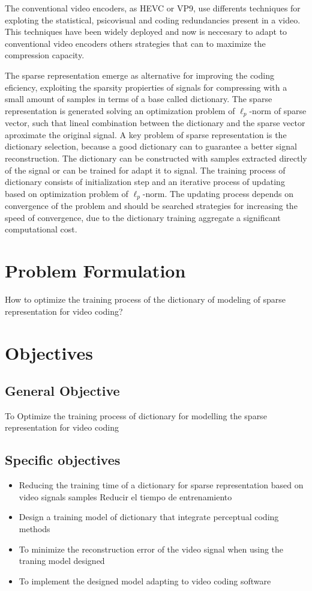The conventional video encoders, as HEVC or VP9, use differents techniques for
exploting the statistical, psicovisual and coding redundancies present in a
video. This techniques have been widely deployed and now is neccesary to adapt
to conventional video encoders others strategies that can to maximize the
compression capacity. 

The sparse representation emerge as alternative for improving the coding
eficiency, exploiting the sparsity propierties of signals for compressing with a
small amount of samples in terms of a base called dictionary. The sparse
representation is generated solving an optimization problem of $\ell_p$-norm of
sparse vector, such that lineal combination between the dictionary and the
sparse vector aproximate the original signal. A key problem of sparse
representation is the dictionary selection, because a good dictionary can to
guarantee a better signal reconstruction. The dictionary can be constructed with
samples extracted directly of the signal or can be trained for adapt it to
signal. The training process of dictionary consists of initialization step and
an iterative process of updating based on optimization problem of $\ell_p$-norm.
The updating process depends on convergence of the problem and should be
searched strategies for increasing the speed of convergence, due to the
dictionary training aggregate a significant computational cost.



\section{Problem Formulation}
How to optimize the training process of the dictionary of modeling of sparse
representation for video coding?

\section{Objectives}
\subsection{General Objective}
To Optimize the training process of dictionary for modelling the sparse
representation for video coding

\subsection{Specific objectives}
\begin{itemize}
\item Reducing the training time of a dictionary for sparse
representation based on video signals samples Reducir el tiempo de entrenamiento
\item Design a training model of dictionary that integrate perceptual coding
methods
\item To minimize the reconstruction error of the video signal when
using the traning model designed
\item To implement the designed model adapting to video coding
software 
\end{itemize}

